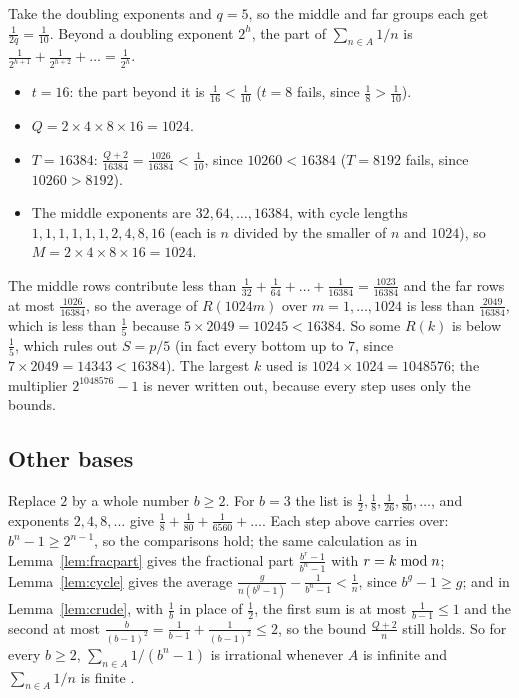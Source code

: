 \documentclass[10pt]{article}
\theoremstyle{plain}
\theoremstyle{definition}
\theoremstyle{remark}
\newcommand{\rmod}{\mskip5mu\mathrm{mod}\mskip5mu}
\begin{document}
Take the doubling exponents and $q=5$, so the middle and far groups each get
$\tfrac1{2q}=\tfrac1{10}$. Beyond a doubling exponent $2^h$, the part of
$\sum_{n\in A}1/n$ is $\tfrac1{2^{h+1}}+\tfrac1{2^{h+2}}+\dots=\tfrac1{2^h}$.
\begin{itemize}
\item $t=16$: the part beyond it is $\tfrac1{16}<\tfrac1{10}$ ($t=8$ fails,
 since $\tfrac18>\tfrac1{10}$).
\item $Q=2\times4\times8\times16=1024$.
\item $T=16384$: $\tfrac{Q+2}{16384}=\tfrac{1026}{16384}<\tfrac1{10}$, since
 $10260<16384$ ($T=8192$ fails, since $10260>8192$).
\item The middle exponents are $32,64,\dots,16384$, with cycle lengths
 $1,1,1,1,1,1,2,4,8,16$ (each is $n$ divided by the smaller of $n$ and
 $1024$), so $M=2\times4\times8\times16=1024$.
\end{itemize}
The middle rows contribute less than
$\tfrac1{32}+\tfrac1{64}+\dots+\tfrac1{16384}=\tfrac{1023}{16384}$ and the far
rows at most $\tfrac{1026}{16384}$, so the average of $R(1024m)$ over
$m=1,\dots,1024$ is less than $\tfrac{2049}{16384}$, which is less than
$\tfrac15$ because $5\times2049=10245<16384$. So some $R(k)$ is below
$\tfrac15$, which rules out $S=p/5$ (in fact every bottom up to $7$, since
$7\times2049=14343<16384$). The largest $k$ used is $1024\times1024=1048576$;
the multiplier $2^{1048576}-1$ is never written out, because every step uses
only the bounds.

\subsection{Other bases}\label{app:bases}

Replace $2$ by a whole number $b\ge2$. For $b=3$ the list is
$\tfrac12,\tfrac18,\tfrac1{26},\tfrac1{80},\dots$, and exponents $2,4,8,\dots$
give $\tfrac18+\tfrac1{80}+\tfrac1{6560}+\dots$. Each step above carries over:
$b^n-1\ge2^{n-1}$, so the comparisons hold; the same calculation as in
Lemma~\ref{lem:fracpart} gives the fractional part $\tfrac{b^r-1}{b^n-1}$ with
$r=k\rmod n$; Lemma~\ref{lem:cycle} gives the average
$\tfrac g{n(b^g-1)}-\tfrac1{b^n-1}<\tfrac1n$, since $b^g-1\ge g$; and in
Lemma~\ref{lem:crude}, with $\tfrac1b$ in place of $\tfrac12$, the first sum is
at most $\tfrac1{b-1}\le1$ and the second at most $\tfrac b{(b-1)^2}=\tfrac1{b-1}+\tfrac1{(b-1)^2}\le2$,
so the bound $\tfrac{Q+2}n$ still holds. So for every $b\ge2$,
$\sum_{n\in A}1/(b^n-1)$ is irrational whenever $A$ is infinite and
$\sum_{n\in A}1/n$ is finite \cite[Theorem~A.1]{shortpaper}.
\end{document}
